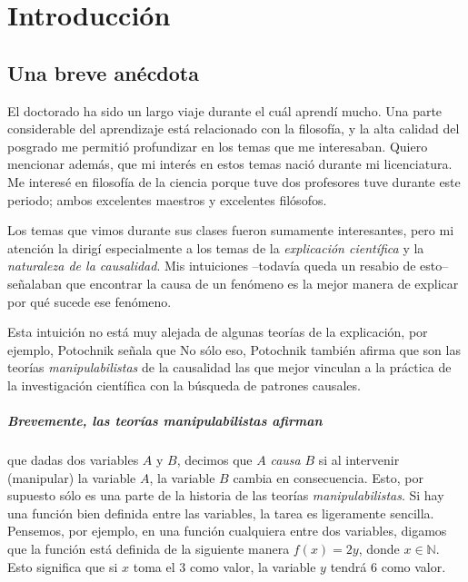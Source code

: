 
\chapter{Introducción}

\section{Una breve anécdota}

\noindent El doctorado ha sido un largo viaje durante el cuál aprendí mucho. 
Una parte considerable del aprendizaje está relacionado con la filosofía, 
y la alta calidad del posgrado me permitió profundizar en los temas que me interesaban. 
Quiero mencionar además, que mi interés en estos temas nació durante mi licenciatura. 
Me interesé en filosofía de la ciencia porque tuve dos profesores tuve durante este periodo; ambos excelentes maestros y excelentes filósofos.

Los temas que vimos durante sus clases fueron sumamente interesantes, pero mi atención la dirigí especialmente a los temas de la \emph{explicación científica} y la \emph{naturaleza de la causalidad}. 
Mis intuiciones --todavía queda un resabio de esto-- señalaban que encontrar la causa de un fenómeno es la mejor manera de explicar por qué sucede ese fenómeno.

Esta intuición no está muy alejada de algunas teorías de la
explicación, por ejemplo, Potochnik señala que  \parencite[][p.~24]{Potochnik2017-POTIAT-3} 
No sólo eso, Potochnik también afirma que son las teorías \emph{manipulabilistas} \parencite{sep-causation-mani} de la causalidad las que mejor vinculan a la práctica de la investigación científica con la búsqueda de patrones causales. 

\paragraph{Brevemente, las teorías \emph{manipulabilistas} afirman} que dadas dos variables $A$ y $B$, decimos que $A$ \emph{causa} $B$ si al intervenir (manipular) la variable $A$, la variable $B$ cambia en consecuencia.
Esto, por supuesto sólo es una parte de la historia de las teorías \emph{manipulabilistas}. 
Si hay una función bien definida entre las variables, la tarea es ligeramente sencilla.
Pensemos, por ejemplo, en una función cualquiera entre dos variables, digamos que la función está definida de la siguiente manera $f(x) = 2y$, donde $x \in \mathbb{N}$.
Esto significa que si $x$ toma el $3$ como valor, la variable $y$ tendrá $6$ como valor.

